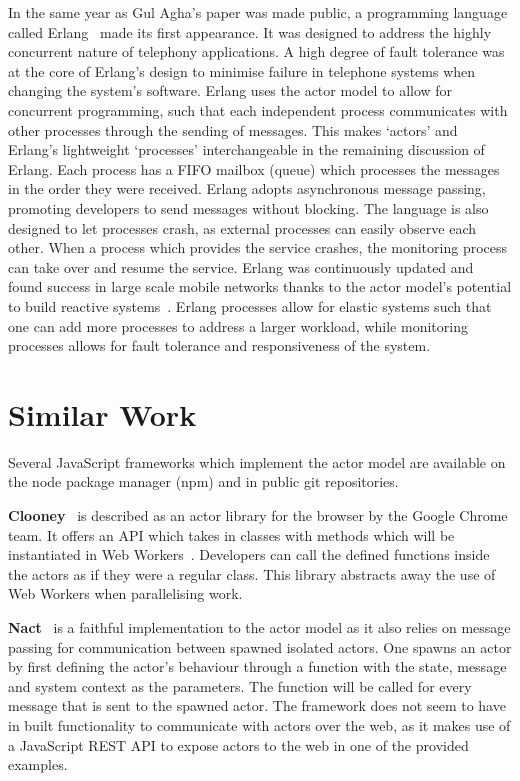 \documentclass[oneside]{um-fict}
\begin{document}
In the same year as Gul Agha's paper was made public, a programming language called Erlang~\cite{erlang} made its first appearance. It was designed to address the highly concurrent nature of telephony applications. A high degree of fault tolerance was at the core of Erlang's design to minimise failure in telephone systems when changing the system's software. Erlang uses the actor model to allow for concurrent programming, such that each independent process communicates with other processes through the sending of messages. This makes `actors' and Erlang's lightweight `processes' interchangeable in the remaining discussion of Erlang. Each process has a FIFO mailbox (queue) which processes the messages in the order they were received. Erlang adopts asynchronous message passing, promoting developers to send messages without blocking. The language is also designed to let processes crash, as external processes can easily observe each other. When a process which provides the service crashes, the monitoring process can take over and resume the service. Erlang was continuously updated and found success in large scale mobile networks thanks to the actor model's potential to build reactive systems~\cite{reactivemanifesto}. Erlang processes allow for elastic systems such that one can add more processes to address a larger workload, while monitoring processes allows for fault tolerance and responsiveness of the system. 

\section{Similar Work}
Several JavaScript frameworks which implement the actor model are available on the node package manager (npm) and in public git repositories.

\textbf{Clooney}~\cite{clooney} is described as an actor library for the browser by the Google Chrome team. It offers an API which takes in classes with methods which will be instantiated in Web Workers~\cite{webworkers}. Developers can call the defined functions inside the actors as if they were a regular class. This library abstracts away the use of Web Workers when parallelising work.

\textbf{Nact}~\cite{nact} is a faithful implementation to the actor model as it also relies on message passing for communication between spawned isolated actors. One spawns an actor by first defining the actor's behaviour through a function with the state, message and system context as the parameters. The function will be called for every message that is sent to the spawned actor. The framework does not seem to have in built functionality to communicate with actors over the web, as it makes use of a JavaScript REST API to expose actors to the web in one of the provided examples.
\end{document}
